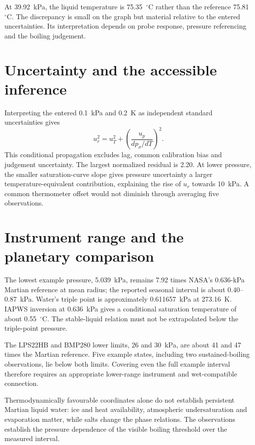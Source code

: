 At 39.92~kPa, the liquid temperature is 75.35~$^\circ$C rather than the reference 75.81~$^\circ$C. The discrepancy is small on the graph but material relative to the entered uncertainties. Its interpretation depends on probe response, pressure referencing and the boiling judgement.

\section{Uncertainty and the accessible inference}
Interpreting the entered 0.1~kPa and 0.2~K as independent standard uncertainties gives
\begin{equation}
 u_r^2=u_T^2+\left(\frac{u_p}{dp_\sigma/dT}\right)^2.
 \label{eq:pressure-boiling-uncertainty}
\end{equation}
This conditional propagation excludes lag, common calibration bias and judgement uncertainty. The largest normalized residual is 2.20. At lower pressure, the smaller saturation-curve slope gives pressure uncertainty a larger temperature-equivalent contribution, explaining the rise of $u_r$ towards 10~kPa. A common thermometer offset would not diminish through averaging five observations.

\section{Instrument range and the planetary comparison}
The lowest example pressure, 5.039~kPa, remains 7.92 times NASA's 0.636-kPa Martian reference at mean radius; the reported seasonal interval is about 0.40--0.87~kPa\cite{nasamarsfacts}. Water's triple point is approximately 0.611657~kPa at 273.16~K. IAPWS inversion at 0.636~kPa gives a conditional saturation temperature of about 0.55~$^\circ$C. The stable-liquid relation must not be extrapolated below the triple-point pressure.

The LPS22HB and BMP280 lower limits, 26 and 30~kPa\cite{lps22hb,bmp280}, are about 41 and 47 times the Martian reference. Five example states, including two sustained-boiling observations, lie below both limits. Covering even the full example interval therefore requires an appropriate lower-range instrument and wet-compatible connection.

Thermodynamically favourable coordinates alone do not establish persistent Martian liquid water: ice and heat availability, atmospheric undersaturation and evaporation matter, while salts change the phase relations\cite{haberle2001}. The observations establish the pressure dependence of the visible boiling threshold over the measured interval.

